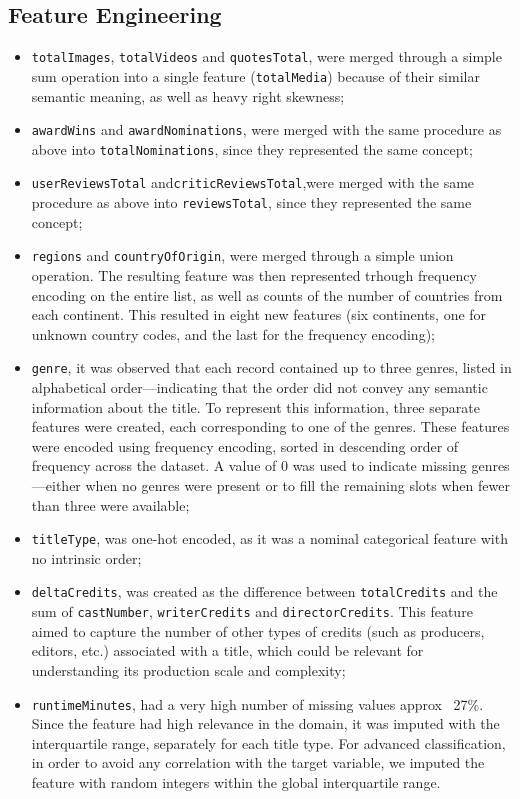 \subsection{Feature Engineering}
\begin{itemize}
    \item \texttt{totalImages}, \texttt{totalVideos} and \texttt{quotesTotal}, were merged
through a simple sum operation
into a single feature (\texttt{totalMedia}) because of their similar semantic
meaning, as well as heavy right skewness;
    \item \texttt{awardWins} and \texttt{awardNominations}, were merged with the same procedure
as above into \texttt{totalNominations}, since they represented the same concept;
    \item \texttt{userReviewsTotal} and\texttt{criticReviewsTotal},were merged with the same procedure
as above into \texttt{reviewsTotal}, since they represented the same concept;
    \item \texttt{regions} and \texttt{countryOfOrigin},
were merged through a simple union operation. The resulting feature was then
represented trhough frequency encoding on the entire list, as well as
counts of the number of countries from each continent.
This resulted in eight new features (six continents, one for unknown country codes,
and the last for the frequency encoding);
    \item \texttt{genre}, it was observed that each record
contained up to three genres, listed in alphabetical order—indicating that the order
did not convey any semantic information about the title.
To represent this information, three separate features were created, each
corresponding to one of the genres. These features were encoded using frequency
encoding, sorted in descending order of frequency across the dataset.  
A value of 0 was used to indicate missing genres—either when no genres were present or
to fill the remaining slots when fewer than three were available;
\item \texttt{titleType}, was one-hot encoded, as it was a nominal categorical
feature with no intrinsic order;
    \item \texttt{deltaCredits}, was created as the difference between
\texttt{totalCredits} and the sum of \texttt{castNumber}, \texttt{writerCredits} and \texttt{directorCredits}. 
This feature aimed to capture the number of other types of credits
(such as producers, editors, etc.) associated with a title, which could be relevant for
understanding its production scale and complexity;
    \item \texttt{runtimeMinutes}, had a very high number of missing values approx ~27\%. 
    Since the feature had high relevance in the domain, it was
imputed with the interquartile range, separately for each title
type. For advanced classification, in order to avoid any correlation with the target variable, 
we imputed the feature with random integers within the global interquartile range.

\end{itemize}



